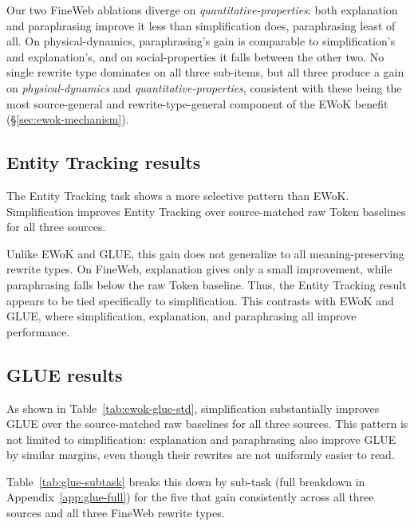 \documentclass[11pt]{article}
\begin{document}
Our two FineWeb ablations diverge on \textit{quantitative-properties}: both explanation and paraphrasing improve it less than simplification does, paraphrasing least of all. On physical-dynamics, paraphrasing's gain is comparable to simplification's and explanation's, and on social-properties it falls between the other two. No single rewrite type dominates on all three sub-items, but all three produce a gain on \textit{physical-dynamics} and \textit{quantitative-properties}, consistent with these being the most source-general and rewrite-type-general component of the EWoK benefit (\S\ref{sec:ewok-mechanism}).


\subsection{Entity Tracking results}
\label{sec:results-entity}


The Entity Tracking task shows a more selective pattern than EWoK. Simplification improves Entity Tracking over source-matched raw Token baselines for all three sources.

Unlike EWoK and GLUE, this gain does not generalize to all meaning-preserving rewrite types. On FineWeb, explanation gives only a small improvement, while paraphrasing falls below the raw Token baseline. Thus, the Entity Tracking result appears to be tied specifically to simplification. This contrasts with EWoK and GLUE, where simplification, explanation, and paraphrasing all improve performance.


\subsection{GLUE results}
\label{sec:results-glue}

As shown in Table~\ref{tab:ewok-glue-std}, simplification substantially improves GLUE over the source-matched raw baselines for all three sources. This pattern is not limited to simplification: explanation and paraphrasing also improve GLUE by similar margins, even though their rewrites are not uniformly easier to read.

Table~\ref{tab:glue-subtask} breaks this down by sub-task (full breakdown in Appendix~\ref{app:glue-full}) for the five that gain consistently across all three sources and all three FineWeb rewrite types.%
\end{document}
